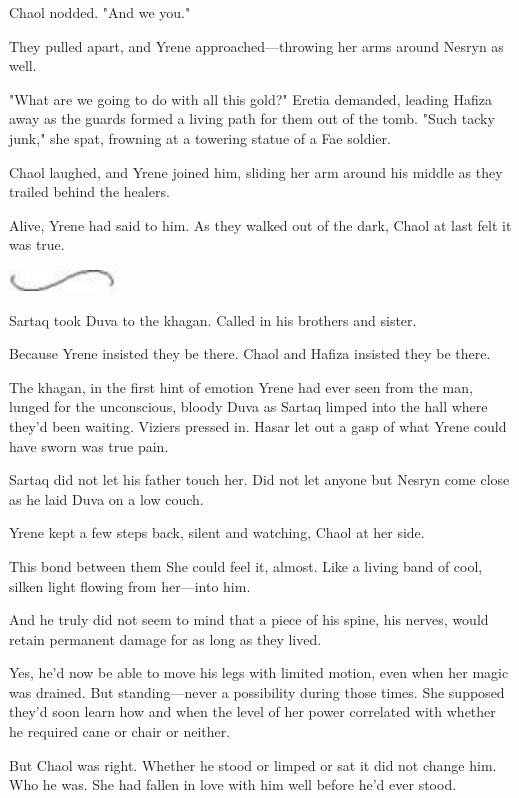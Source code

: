 Chaol nodded. "And we you."

They pulled apart, and Yrene approached---throwing her arms around Nesryn as well.

"What are we going to do with all this gold?" Eretia demanded, leading Hafiza away as the guards formed a living path for them out of the tomb. "Such tacky junk," she spat, frowning at a towering statue of a Fae soldier.

Chaol laughed, and Yrene joined him, sliding her arm around his middle as they trailed behind the healers.

Alive, Yrene had said to him. As they walked out of the dark, Chaol at last felt it was true.

\includegraphics[width=1.12in,height=0.24in]{images/seperator}

Sartaq took Duva to the khagan. Called in his brothers and sister.

Because Yrene insisted they be there. Chaol and Hafiza insisted they be there.

The khagan, in the first hint of emotion Yrene had ever seen from the man, lunged for the unconscious, bloody Duva as Sartaq limped into the hall where they'd been waiting. Viziers pressed in. Hasar let out a gasp of what Yrene could have sworn was true pain.

Sartaq did not let his father touch her. Did not let anyone but Nesryn come close as he laid Duva on a low couch.

Yrene kept a few steps back, silent and watching, Chaol at her side.

This bond between them  She could feel it, almost. Like a living band of cool, silken light flowing from her---into him.

And he truly did not seem to mind that a piece of his spine, his nerves, would retain permanent damage for as long as they lived.

Yes, he'd now be able to move his legs with limited motion, even when her magic was drained. But standing---never a possibility during those times. She supposed they'd soon learn how and when the level of her power correlated with whether he required cane or chair or neither.

But Chaol was right. Whether he stood or limped or sat  it did not change him. Who he was. She had fallen in love with him well before he'd ever stood.


